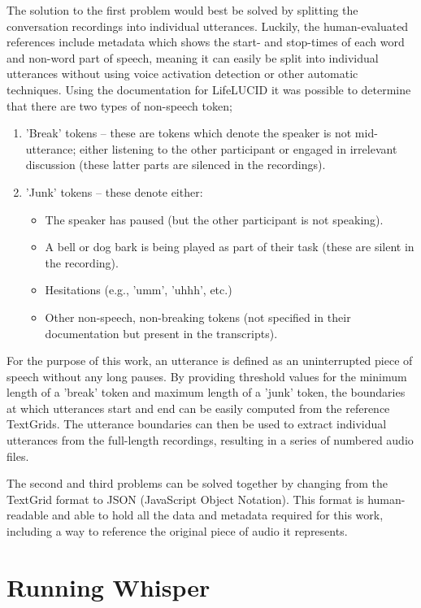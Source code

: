 The solution to the first problem would best be solved by splitting the conversation recordings into individual utterances.
Luckily, the human-evaluated references include metadata which shows the start- and stop-times of each word and non-word part of speech, meaning it can easily be split into individual utterances without using voice activation detection or other automatic techniques.
Using the documentation for LifeLUCID it was possible to determine that there are two types of non-speech token;

\begin{enumerate}
  \item 'Break' tokens -- these are tokens which denote the speaker is not mid-utterance; either listening to the other participant or engaged in irrelevant discussion (these latter parts are silenced in the recordings).
  \item 'Junk' tokens -- these denote either:
    \begin{itemize}
      \item The speaker has paused (but the other participant is not speaking).
      \item A bell or dog bark is being played as part of their task (these are silent in the recording).
      \item Hesitations (e.g., 'umm', 'uhhh', etc.)
      \item Other non-speech, non-breaking tokens (not specified in their documentation but present in the transcripts).
    \end{itemize}
\end{enumerate}

For the purpose of this work, an utterance is defined as an uninterrupted piece of speech without any long pauses.
By providing threshold values for the minimum length of a 'break' token and maximum length of a 'junk' token, the boundaries at which utterances start and end can be easily computed from the reference TextGrids.
The utterance boundaries can then be used to extract individual utterances from the full-length recordings, resulting in a series of numbered audio files.

The second and third problems can be solved together by changing from the TextGrid format to JSON (JavaScript Object Notation).
This format is human-readable\cite{nurseitov2009comparison} and able to hold all the data and metadata required for this work, including a way to reference the original piece of audio it represents.

\section{Running Whisper}

